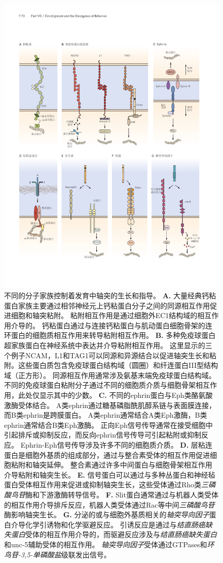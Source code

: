 \begin{figure}[htbp]
	\centering
	\includegraphics[width=0.85\linewidth]{chap47/fig_47_11}
	\caption{不同的分子家族控制着发育中轴突的生长和指导。
		\textbf{A.} 大量经典钙粘蛋白家族主要通过相邻神经元上钙粘蛋白分子之间的同源相互作用促进细胞和轴突粘附。
		粘附相互作用是通过细胞外EC1结构域的相互作用介导的。
		钙粘蛋白通过与连接钙粘蛋白与肌动蛋白细胞骨架的连环蛋白的细胞质相互作用来转导粘附相互作用。
		\textbf{B.} 多种免疫球蛋白超家族蛋白在神经系统中表达并介导粘附相互作用。
		这里显示的三个例子NCAM，L1和TAG1可以同源和异源结合以促进轴突生长和粘附。这些蛋白质包含免疫球蛋白结构域（圆圈）和纤连蛋白III型结构域（正方形）。
		同源相互作用通常涉及氨基末端免疫球蛋白结构域。
		不同的免疫球蛋白粘附分子通过不同的细胞质介质与细胞骨架相互作用，此处仅显示其中的少数。
		\textbf{C.} 不同的ephrin蛋白与Eph类酪氨酸激酶受体结合。
		A类ephrin通过糖基磷脂酰肌醇系链与表面膜连接，而B类ephrin是跨膜蛋白。
		A类ephrin通常结合A类Eph激酶，B类ephrin通常结合B类Eph激酶。
		正向Eph信号传导通常在接受细胞中引起排斥或抑制反应，而反向ephrin信号传导可引起粘附或抑制反应。
		Ephrin-Eph信号传导涉及许多不同的细胞质介质。
		\textbf{D.} 层粘连蛋白是细胞外基质的组成部分，通过与整合素受体的相互作用促进细胞粘附和轴突延伸。
		整合素通过许多中间蛋白与细胞骨架相互作用介导粘附和轴突生长。
		\textbf{E.} 信号蛋白可以通过与多种丛蛋白和神经毡蛋白受体相互作用来促进或抑制轴突生长，这些受体通过Rho类\textit{三磷酸鸟苷}酶和下游激酶转导信号。
		\textbf{F.} Slit蛋白通常通过与机器人类受体的相互作用介导排斥反应，机器人类受体通过Rac等中间\textit{三磷酸鸟苷}酶影响轴突生长。
		\textbf{G.} 分泌的或与细胞外基质相关的\textit{轴突导向因子}蛋白介导化学引诱物和化学驱避反应。
		引诱反应是通过与\textit{结直肠癌缺失蛋白}受体的相互作用介导的，而驱避反应涉及与\textit{结直肠癌缺失蛋白}和unc-5辅助受体的相互作用。
		\textit{轴突导向因子}受体通过GTPases和\textit{环鸟苷-3,5-单磷酸盐}级联发出信号。}
	\label{fig:47_11}
\end{figure}


